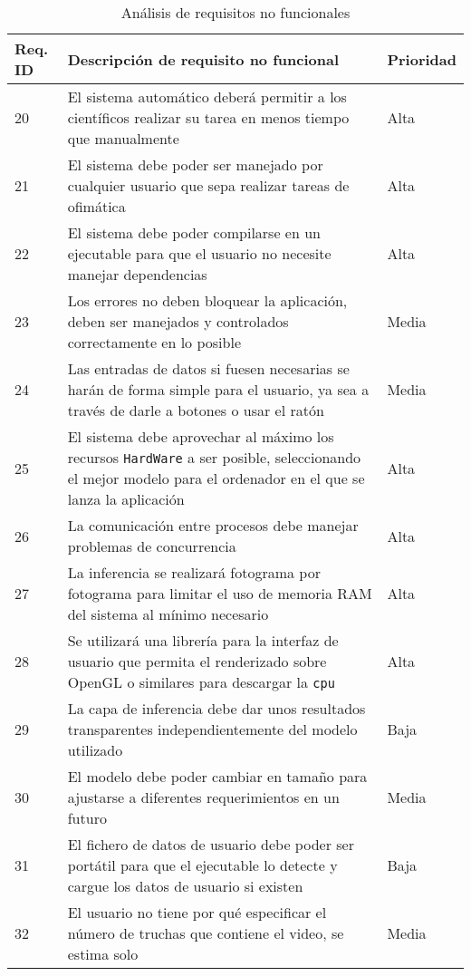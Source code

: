 \begin{table}[H]
    \begin{center}
        \begin{tabular}{p{} | p{} p{}}
            Req. ID & Descripción de requisito no funcional & Prioridad\\
            \hline
            20& El sistema automático deberá permitir a los científicos realizar su tarea en menos tiempo que manualmente & Alta\\
            \hline
            21& El sistema debe poder ser manejado por cualquier usuario que sepa realizar tareas de ofimática & Alta\\
            \hline
            22& El sistema debe poder compilarse en un ejecutable para que el usuario no necesite manejar dependencias  & Alta\\
            \hline
            23& Los errores no deben bloquear la aplicación, deben ser manejados y controlados correctamente en lo posible & Media\\
            \hline
            24& Las entradas de datos si fuesen necesarias se harán de forma simple para el usuario, ya sea a través de darle a botones o usar el ratón & Media\\
            \hline
            25& El sistema debe aprovechar al máximo los recursos \texttt{HardWare} a ser posible, seleccionando el mejor modelo para el ordenador en el que se lanza la aplicación & Alta\\
            \hline
            26& La comunicación entre procesos debe manejar problemas de concurrencia & Alta\\
            \hline
            27& La inferencia se realizará fotograma por fotograma para limitar el uso de memoria RAM del sistema al mínimo necesario & Alta\\
            \hline
            28& Se utilizará una librería para la interfaz de usuario que permita el renderizado sobre OpenGL o similares para descargar la \texttt{\acrshort{cpu}} & Alta\\
            \hline
            29& La capa de inferencia debe dar unos resultados transparentes independientemente del modelo utilizado & Baja\\
            \hline
            30& El modelo debe poder cambiar en tamaño para ajustarse a diferentes requerimientos en un futuro & Media\\
            \hline
            31& El fichero de datos de usuario debe poder ser portátil para que el ejecutable lo detecte y cargue los datos de usuario si existen & Baja\\
            \hline
            32& El usuario no tiene por qué especificar el número de truchas que contiene el video, se estima solo & Media\\
            \hline
        \end{tabular} 
    \end{center}
    \caption{Análisis de requisitos no funcionales}
    \label{ReqNoFuncionales}
\end{table}

